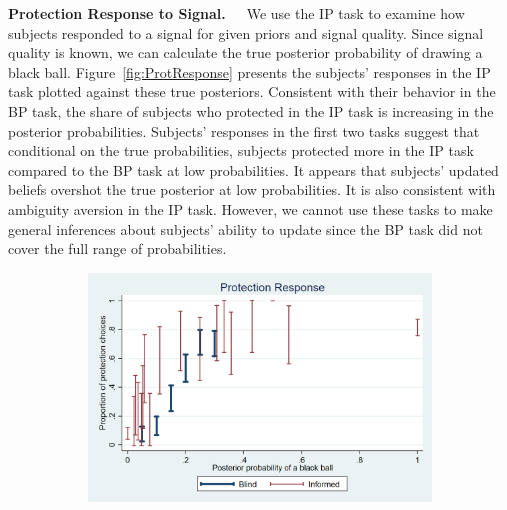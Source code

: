 \documentclass[12pt,a4paper]{article}
\begin{document}
\bigskip\noindent\textbf{Protection Response to Signal.}\ \ \ We use the IP task to examine how subjects responded to a signal for given priors and signal quality. Since signal quality is known, we can calculate the true posterior probability of drawing a black ball. Figure~\ref{fig:ProtResponse} presents the subjects’ responses in the IP task plotted against these true posteriors. Consistent with their behavior in the BP task, the share of subjects who protected in the IP task is increasing in the posterior probabilities. Subjects' responses in the first two tasks suggest that conditional on the true probabilities, subjects protected more in the IP task compared to the BP task at low probabilities. It appears that subjects’ updated beliefs overshot the true posterior at low probabilities. It is also consistent with ambiguity aversion in the IP task. However, we cannot use these tasks to make general inferences about subjects’ ability to update since the BP task did not cover the full range of probabilities.


\begin{figure}[H]
\centering
\caption{Average Protection Response} \label{fig:ProtResponse}
\begin{subfigure}[t]{.75\textwidth}
  \centering
  \includegraphics[width=\textwidth]{Graphs/ip_response_comp.png}
\end{subfigure}
%
\end{figure}
\end{document}
